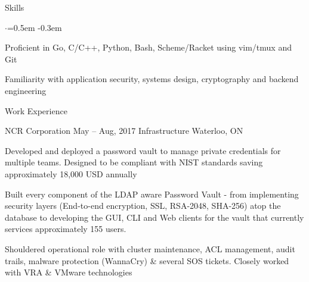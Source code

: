 \documentclass{resume} %
\begin{document}

\begin{rSection}{Skills}
  \vspace {0.3em}
  \begin{list}{$\cdot$}{\leftmargin=0.5em}
    \itemsep -0.3em \vspace{-0.3em}
    \item Proficient in Go, C/C++, Python, Bash, Scheme/Racket using vim/tmux and Git 
    \item Familiarity with application security, systems design, cryptography
      and backend engineering
  \end{list}
  \vspace{0.3em}
\end{rSection}



\begin{rSection}{Work Experience}
  \begin{rSubsection}{NCR Corporation}
		     {May -- Aug, 2017}
		     {Infrastructure}
		     {Waterloo, ON}
    \item Developed and deployed a password vault to manage private credentials
      for multiple teams. Designed to be compliant with NIST standards saving
      approximately 18,000 USD annually
    \item Built every component of the LDAP aware Password Vault - from implementing security layers 
      (End-to-end encryption, SSL, RSA-2048, SHA-256) atop the database to developing the GUI, CLI and
      Web clients for the vault that currently services approximately 155 users.
    \item Shouldered operational role with cluster maintenance, ACL management,
      audit trails, malware protection (WannaCry) \& several SOS tickets. Closely worked with VRA \&
      VMware technologies
  \end{rSubsection}
\end{rSection} 
\end{document}
